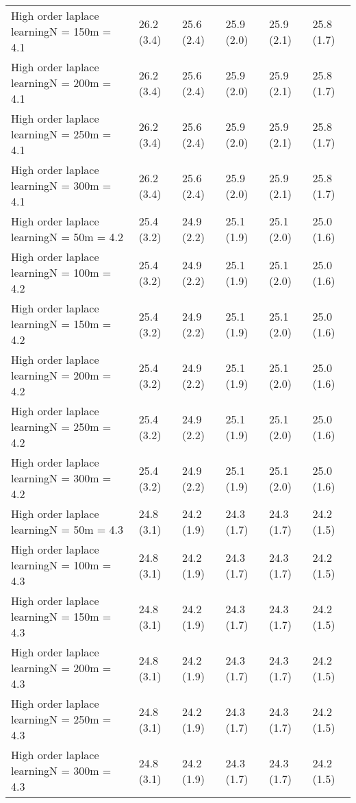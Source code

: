 \documentclass{article}
\begin{document}
\begin{table*}[t!]
\begin{center}
\begin{small}
\begin{sc}
\begin{tabular}{llllll}
High order laplace learningN = 150m = 4.1&26.2 (3.4)      &25.6 (2.4)      &25.9 (2.0)      &25.9 (2.1)      &25.8 (1.7)      \\
High order laplace learningN = 200m = 4.1&26.2 (3.4)      &25.6 (2.4)      &25.9 (2.0)      &25.9 (2.1)      &25.8 (1.7)      \\
High order laplace learningN = 250m = 4.1&26.2 (3.4)      &25.6 (2.4)      &25.9 (2.0)      &25.9 (2.1)      &25.8 (1.7)      \\
High order laplace learningN = 300m = 4.1&26.2 (3.4)      &25.6 (2.4)      &25.9 (2.0)      &25.9 (2.1)      &25.8 (1.7)      \\
High order laplace learningN = 50m = 4.2&25.4 (3.2)      &24.9 (2.2)      &25.1 (1.9)      &25.1 (2.0)      &25.0 (1.6)      \\
High order laplace learningN = 100m = 4.2&25.4 (3.2)      &24.9 (2.2)      &25.1 (1.9)      &25.1 (2.0)      &25.0 (1.6)      \\
High order laplace learningN = 150m = 4.2&25.4 (3.2)      &24.9 (2.2)      &25.1 (1.9)      &25.1 (2.0)      &25.0 (1.6)      \\
High order laplace learningN = 200m = 4.2&25.4 (3.2)      &24.9 (2.2)      &25.1 (1.9)      &25.1 (2.0)      &25.0 (1.6)      \\
High order laplace learningN = 250m = 4.2&25.4 (3.2)      &24.9 (2.2)      &25.1 (1.9)      &25.1 (2.0)      &25.0 (1.6)      \\
High order laplace learningN = 300m = 4.2&25.4 (3.2)      &24.9 (2.2)      &25.1 (1.9)      &25.1 (2.0)      &25.0 (1.6)      \\
High order laplace learningN = 50m = 4.3&24.8 (3.1)      &24.2 (1.9)      &24.3 (1.7)      &24.3 (1.7)      &24.2 (1.5)      \\
High order laplace learningN = 100m = 4.3&24.8 (3.1)      &24.2 (1.9)      &24.3 (1.7)      &24.3 (1.7)      &24.2 (1.5)      \\
High order laplace learningN = 150m = 4.3&24.8 (3.1)      &24.2 (1.9)      &24.3 (1.7)      &24.3 (1.7)      &24.2 (1.5)      \\
High order laplace learningN = 200m = 4.3&24.8 (3.1)      &24.2 (1.9)      &24.3 (1.7)      &24.3 (1.7)      &24.2 (1.5)      \\
High order laplace learningN = 250m = 4.3&24.8 (3.1)      &24.2 (1.9)      &24.3 (1.7)      &24.3 (1.7)      &24.2 (1.5)      \\
High order laplace learningN = 300m = 4.3&24.8 (3.1)      &24.2 (1.9)      &24.3 (1.7)      &24.3 (1.7)      &24.2 (1.5)      \\

\end{tabular}
\end{sc}
\end{small}
\end{center}
\end{table*}
\end{document}
